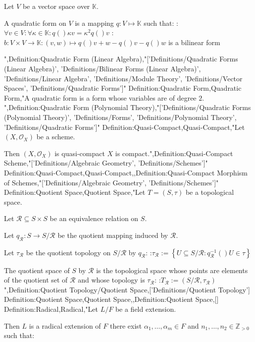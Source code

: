Let $V$ be a vector space over $\mathbb K$.


A quadratic form on $V$ is a mapping $q : V \mapsto \mathbb K$ such that:
:$\forall v \in V : \forall \kappa \in \mathbb K : q \left(   \right){\kappa v} = \kappa^2 q \left(   \right)v$
:$b: V \times V \to \mathbb K: \left( v, w \right) \mapsto q \left(   \right){v + w} - q \left(   \right)v - q \left(   \right)w$ is a bilinear form


",Definition:Quadratic Form (Linear Algebra),"['Definitions/Quadratic Forms (Linear Algebra)', 'Definitions/Bilinear Forms (Linear Algebra)', 'Definitions/Linear Algebra', 'Definitions/Module Theory', 'Definitions/Vector Spaces', 'Definitions/Quadratic Forms']"
Definition:Quadratic Form,Quadratic Form,"A quadratic form is a form whose variables are of degree $2$.
",Definition:Quadratic Form (Polynomial Theory),"['Definitions/Quadratic Forms (Polynomial Theory)', 'Definitions/Forms', 'Definitions/Polynomial Theory', 'Definitions/Quadratic Forms']"
Definition:Quasi-Compact,Quasi-Compact,"Let $\left( X, \mathcal O_X \right)$ be a scheme.


Then $\left( X, \mathcal O_X \right)$ is quasi-compact  $X$ is compact.",Definition:Quasi-Compact Scheme,"['Definitions/Algebraic Geometry', 'Definitions/Schemes']"
Definition:Quasi-Compact,Quasi-Compact,,Definition:Quasi-Compact Morphism of Schemes,"['Definitions/Algebraic Geometry', 'Definitions/Schemes']"
Definition:Quotient Space,Quotient Space,"Let $T = \left( S, \tau \right)$ be a topological space.

Let $\mathcal R \subseteq S \times S$ be an equivalence relation on $S$.

Let $q_\mathcal R: S \to S / \mathcal R$ be the quotient mapping induced by $\mathcal R$.


Let $\tau_\mathcal R$ be the quotient topology on $S / \mathcal R$ by $q_\mathcal R$:
:$\tau_\mathcal R := \left\lbrace U \subseteq S / \mathcal R: q_\mathcal R^{-1}  \left(   \right)U \in \tau \right\rbrace$


The quotient space of $S$ by $\mathcal R$ is the topological space whose points are elements of the quotient set of $\mathcal R$ and whose topology is $\tau_\mathcal R$:
:$T_\mathcal R := \left( S / \mathcal R, \tau_\mathcal R \right)$",Definition:Quotient Topology/Quotient Space,['Definitions/Quotient Topology']
Definition:Quotient Space,Quotient Space,,Definition:Quotient Space,[]
Definition:Radical,Radical,"Let $L / F$ be a field extension.

Then $L$ is a radical extension of $F$  there exist $\alpha_1, \ldots, \alpha_m \in F$ and $n_1, \ldots, n_2 \in \mathbb Z_{>0}$ such that:

